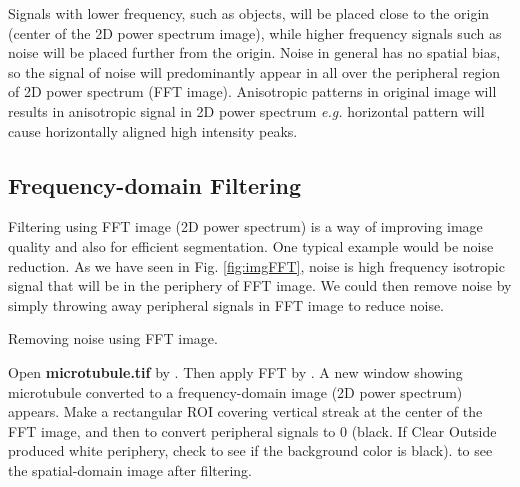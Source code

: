 
Signals with lower frequency, such as objects, will be placed close to
the origin (center of the 2D power spectrum image), while higher frequency signals
such as noise will be placed further from the origin. Noise in general has no spatial bias, so the signal of noise will predominantly appear in all over the peripheral region of 2D power spectrum (FFT image). 
Anisotropic patterns in original image will results in anisotropic signal in 2D power spectrum \textit{e.g.} horizontal pattern will cause horizontally aligned high intensity peaks. 

\subsection{Frequency-domain Filtering}

Filtering using FFT image (2D power spectrum) is a way of improving image quality and
also for efficient segmentation. One typical example would be noise
reduction. As we have seen in Fig. \ref{fig:imgFFT}, noise is high frequency
isotropic signal that will be in the periphery of FFT image. We
could then remove noise by simply throwing away peripheral signals in FFT
image to reduce noise. 

\begin{indentexercise}{1} Removing noise using FFT image. 

Open \textbf{microtubule.tif} by . Then apply FFT
by . A new
window showing microtubule converted to a frequency-domain image (2D power spectrum) appears. Make
a rectangular ROI covering vertical streak at the center of the FFT
image, and then  to
convert peripheral signals to 0 (black. If Clear Outside produced white
periphery, check  to
see if the background color is black).  to see the spatial-domain image after
filtering.
\end{indentexercise}

